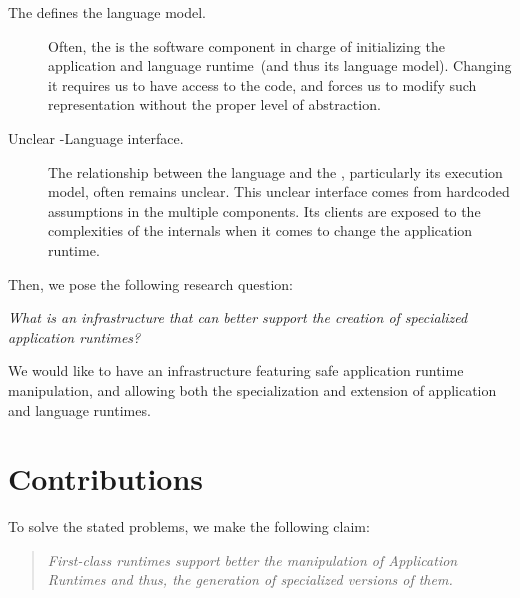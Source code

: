 \begin{description}

\item[The \VM defines the language model.] Often, the \VM is the software component in charge of initializing the application and language runtime~(and thus its language model). Changing it requires us to have access to the \VM code, and forces us to modify such representation without the proper level of abstraction.

\item[Unclear \VM-Language interface.] The relationship between the language and the \VM, particularly its execution model, often remains unclear. This unclear interface comes from hardcoded assumptions in the multiple \VM components. Its clients are exposed to the complexities of the \VM internals when it comes to change the application runtime.



\end{description}

\noindent Then, we pose the following research question:

\begin{center}\emph{What is an infrastructure that can better support the creation of specialized application runtimes?}
\end{center}

We would like to have an infrastructure featuring safe application runtime manipulation, and allowing both the specialization and extension of application and language runtimes.

\section{Contributions}

To solve the stated problems, we make the following claim: \newline

\begin{center}\blockquote{\emph{First-class runtimes support better the manipulation of Application Runtimes and thus, the generation of specialized versions of them.}}
\end{center}

